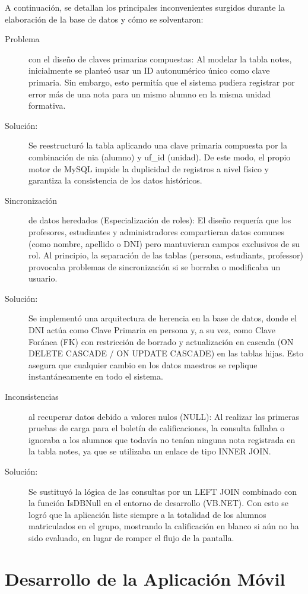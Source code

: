\documentclass[spanish]{report}
\begin{document}
A continuación, se detallan los principales inconvenientes surgidos
durante la elaboración de la base de datos y cómo se solventaron:
\begin{description}
\item [{Problema}] con el diseño de claves primarias compuestas: Al modelar
la tabla notes, inicialmente se planteó usar un ID autonumérico único
como clave primaria. Sin embargo, esto permitía que el sistema pudiera
registrar por error más de una nota para un mismo alumno en la misma
unidad formativa.
\item [{Solución:}] Se reestructuró la tabla aplicando una clave primaria
compuesta por la combinación de nia (alumno) y uf\_id (unidad). De
este modo, el propio motor de MySQL impide la duplicidad de registros
a nivel físico y garantiza la consistencia de los datos históricos.
\item [{Sincronización}] de datos heredados (Especialización de roles):
El diseño requería que los profesores, estudiantes y administradores
compartieran datos comunes (como nombre, apellido o DNI) pero mantuvieran
campos exclusivos de su rol. Al principio, la separación de las tablas
(persona, estudiants, professor) provocaba problemas de sincronización
si se borraba o modificaba un usuario.
\item [{Solución:}] Se implementó una arquitectura de herencia en la base
de datos, donde el DNI actúa como Clave Primaria en persona y, a su
vez, como Clave Foránea (FK) con restricción de borrado y actualización
en cascada (ON DELETE CASCADE / ON UPDATE CASCADE) en las tablas hijas.
Esto asegura que cualquier cambio en los datos maestros se replique
instantáneamente en todo el sistema.
\item [{Inconsistencias}] al recuperar datos debido a valores nulos (NULL):
Al realizar las primeras pruebas de carga para el boletín de calificaciones,
la consulta fallaba o ignoraba a los alumnos que todavía no tenían
ninguna nota registrada en la tabla notes, ya que se utilizaba un
enlace de tipo INNER JOIN.
\item [{Solución:}] Se sustituyó la lógica de las consultas por un LEFT
JOIN combinado con la función IsDBNull en el entorno de desarrollo
(VB.NET). Con esto se logró que la aplicación liste siempre a la totalidad
de los alumnos matriculados en el grupo, mostrando la calificación
en blanco si aún no ha sido evaluado, en lugar de romper el flujo
de la pantalla.
\end{description}

\chapter{Desarrollo de la Aplicación Móvil}
\end{document}
